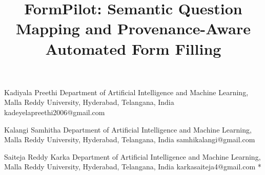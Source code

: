\documentclass[]{einformatica}
\begin{document}
\title{FormPilot: Semantic Question Mapping and Provenance-Aware Automated Form Filling}



\EIauthorI
   {Kadiyala}
   {Preethi}
   {Department of Artificial Intelligence and Machine Learning, Malla Reddy University, Hyderabad, Telangana, India}
   {kadeyelapreethi2006@gmail.com}
   {}
   {}

\EIauthorII
   {Kalangi}
   {Samhitha}
   {Department of Artificial Intelligence and Machine Learning, Malla Reddy University, Hyderabad, Telangana, India}
   {samhikalangi@gmail.com}
   {}
   {}

\EIauthorIII
   {Saiteja Reddy}
   {Karka}
   {Department of Artificial Intelligence and Machine Learning, Malla Reddy University, Hyderabad, Telangana, India}
   {karkasaiteja4@gmail.com}
   {}
   {*}

\end{document}
